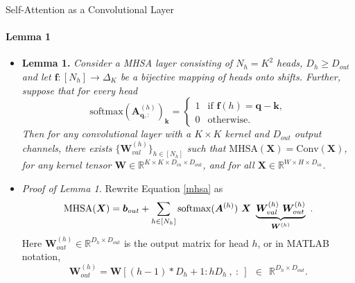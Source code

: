 \documentclass[9pt]{beamer}
\newcommand{\bb}{\mathbb}
\newcommand{\mb}{\bm}
\begin{document}
\begin{frame}{Self-Attention as a Convolutional Layer}
\framesubtitle{Lemma 1}
\begin{itemize}
\item \textbf{Lemma 1.} {\em Consider a MHSA layer consisting of $N_h = K^2$ heads, $D_h\geq D_{out}$ and let $\bm f:[N_h]\rightarrow\Delta_K$ be a bijective mapping of heads onto shifts. Further, suppose that for every head
\begin{equation}
\mathrm{softmax}(\mb A^{(h)}_{\mb q,:})_{\mb k} = \begin{cases}
    1 & \text{if } \mb f(h) = \mb q - \mb k,
    \\ 0 & \text{otherwise}.
    \end{cases} \label{lemma1_assumption}
\end{equation}
Then for any convolutional layer with a $K\times K$ kernel and $D_{out}$ output channels, there exists $\{\bm W_{val}^{(h)}\}_{h\in[N_h]}$ such that $\mathrm{MHSA}(\bm X) = \mathrm{Conv}(\bm X)$, for any kernel tensor $\bm W \in \bb R^{K\times K \times D_{in} \times D_{out}}$, and for all $\bm X\in\bb R^{W\times H\times D_{in}}$.}

\vspace{.05in}
\item \textit{Proof of Lemma 1.} Rewrite Equation \eqref{mhsa} as
\begin{equation}
    \mathrm{MHSA}(\mb X) = \mb b_{out} + 
        \sum_{h\in[N_h]} \mathrm{softmax}(\mb A^{(h)})\ \mb X\ 
        \underbrace{\mb W_{val}^{(h)}\ \mb W_{out}^{(h)}}_{\mb W^{(h)}}\ .
    \vspace{-.1in}
\end{equation}
Here $\bm W_{out}^{(h)} \in \bb R^{D_{h}\times D_{out}}$ is the output matrix for head $h$, or in MATLAB notation,
$$\bm W_{out}^{(h)} = \bm W[(h-1)*D_h+1 : hD_h\ , \ :\ ] \ \ \in\ \ \bb R^{D_h\times D_{out}}.$$
\end{itemize}
\end{frame}
\end{document}
